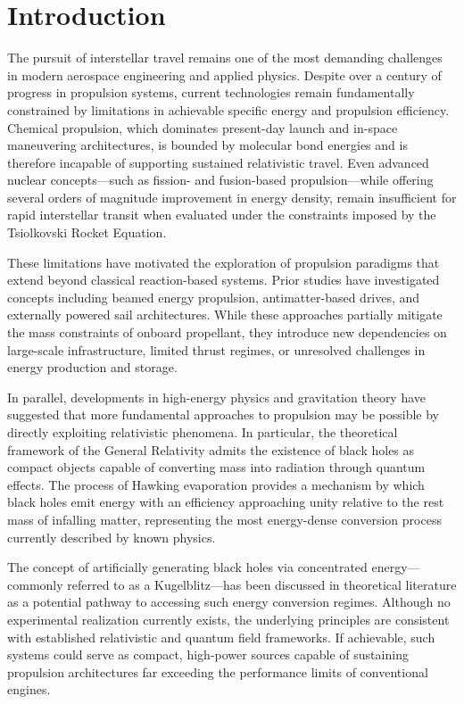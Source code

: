 \documentclass[conference]{IEEEtran}
\begin{document}
\section{Introduction}

The pursuit of interstellar travel remains one of the most demanding challenges in modern aerospace engineering and applied physics. Despite over a century of progress in propulsion systems, current technologies remain fundamentally constrained by limitations in achievable specific energy and propulsion efficiency. Chemical propulsion, which dominates present-day launch and in-space maneuvering architectures, is bounded by molecular bond energies and is therefore incapable of supporting sustained relativistic travel. Even advanced nuclear concepts—such as fission- and fusion-based propulsion—while offering several orders of magnitude improvement in energy density, remain insufficient for rapid interstellar transit when evaluated under the constraints imposed by the Tsiolkovski Rocket Equation.

These limitations have motivated the exploration of propulsion paradigms that extend beyond classical reaction-based systems. Prior studies have investigated concepts including beamed energy propulsion, antimatter-based drives, and externally powered sail architectures. While these approaches partially mitigate the mass constraints of onboard propellant, they introduce new dependencies on large-scale infrastructure, limited thrust regimes, or unresolved challenges in energy production and storage.

In parallel, developments in high-energy physics and gravitation theory have suggested that more fundamental approaches to propulsion may be possible by directly exploiting relativistic phenomena. In particular, the theoretical framework of the General Relativity admits the existence of black holes as compact objects capable of converting mass into radiation through quantum effects. The process of Hawking evaporation provides a mechanism by which black holes emit energy with an efficiency approaching unity relative to the rest mass of infalling matter, representing the most energy-dense conversion process currently described by known physics.

The concept of artificially generating black holes via concentrated energy—commonly referred to as a Kugelblitz—has been discussed in theoretical literature as a potential pathway to accessing such energy conversion regimes. Although no experimental realization currently exists, the underlying principles are consistent with established relativistic and quantum field frameworks. If achievable, such systems could serve as compact, high-power sources capable of sustaining propulsion architectures far exceeding the performance limits of conventional engines.
\end{document}
